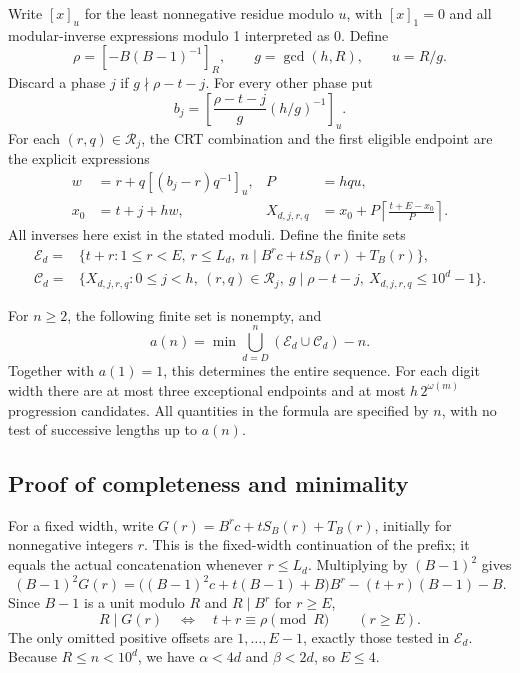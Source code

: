 Write $[x]_u$ for the least nonnegative residue modulo $u$, with
$[x]_1=0$ and all modular-inverse expressions modulo 1 interpreted as 0.
Define
\[
 \rho=[-B(B-1)^{-1}]_R,\qquad g=\gcd(h,R),\qquad u=R/g.
\]
Discard a phase $j$ if $g\nmid\rho-t-j$. For every other phase put
\[
 b_j=\left[\frac{\rho-t-j}{g}(h/g)^{-1}\right]_u.
\]
For each $(r,q)\in\mathcal R_j$, the CRT combination and the first
eligible endpoint are the explicit expressions
\begin{align}
 w&=r+q[(b_j-r)q^{-1}]_u, & P&=hqu,\label{eq:crt-candidate}\\
 x_0&=t+j+hw, &
 X_{d,j,r,q}&=x_0+P\left\lceil\frac{t+E-x_0}{P}\right\rceil.
 \label{eq:first-candidate}
\end{align}
All inverses here exist in the stated moduli.
Define the finite sets
\begin{align*}
 \mathcal E_d={}&\{t+r:1\le r<E,\ r\le L_d,
          \ n\mid B^rc+tS_B(r)+T_B(r)\},\\
 \mathcal C_d={}&\{X_{d,j,r,q}:0\le j<h,\ (r,q)\in\mathcal R_j,
       \ g\mid\rho-t-j,\ X_{d,j,r,q}\le10^d-1\}.
\end{align*}

\begin{theorem}\label{thm:minimum-formula}
For $n\ge2$, the following finite set is nonempty, and
\begin{equation}\label{eq:minimum-formula}
 \boxed{\displaystyle
 a(n)=\min\bigcup_{d=D}^{n}(\mathcal E_d\cup\mathcal C_d)-n.}
\end{equation}
Together with $a(1)=1$, this determines the entire sequence. For each
digit width there are at most three exceptional endpoints and at most
$h\,2^{\omega(m)}$ progression candidates. All quantities in the formula
are specified by $n$, with no test of successive lengths up to $a(n)$.
\end{theorem}

\subsection{Proof of completeness and minimality}
For a fixed width, write $G(r)=B^rc+tS_B(r)+T_B(r)$, initially for
nonnegative integers $r$. This is the fixed-width continuation of the
prefix; it equals the actual concatenation whenever $r\le L_d$.
Multiplying by $(B-1)^2$ gives
\begin{equation}\label{eq:nilpotent-identity}
 (B-1)^2G(r)=\bigl((B-1)^2c+t(B-1)+B\bigr)B^r
                 -(t+r)(B-1)-B.
\end{equation}
Since $B-1$ is a unit modulo $R$ and $R\mid B^r$ for $r\ge E$,
\begin{equation}\label{eq:smooth-endpoint}
 R\mid G(r)\quad\Longleftrightarrow\quad t+r\equiv\rho\pmod R
 \qquad(r\ge E).
\end{equation}
The only omitted positive offsets are $1,\ldots,E-1$, exactly those
tested in $\mathcal E_d$. Because $R\le n<10^d$, we have
$\alpha<4d$ and $\beta<2d$, so $E\le4$.

